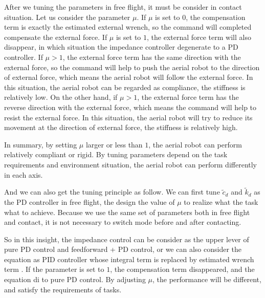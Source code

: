 After we tuning the parameters in free flight, it must be consider in contact situation. Let us consider the parameter $\mu$. If $\mu$ is set to $0$, the compensation term is exactly the estimated external wrench, so the command will completed compensate the external force. If $\mu$ is set to $1$, the external force term will also disappear, in which situation the impedance controller degenerate to a PD controller. If $\mu >1$, the external force term has the same direction with the external force, so the command will help to push the aerial robot to the direction of external force, which means the aerial robot will follow the external force. In this situation, the aerial robot can be regarded as compliance, the stiffness is relatively low. On the other hand, if $\mu >1$, the external force term has the reverse direction with the external force, which means the command will help to resist the external force. In this situation, the aerial robot will try to reduce its movement at the direction of external force, the stiffness is relatively high. 

In summary, by setting $\mu$ larger or less than $1$, the aerial robot can perform relatively compliant or rigid. By tuning parameters depend on the task requirements and environment situation, the aerial robot can perform differently in each axis. 

And we can also get the tuning principle as follow. We can first tune $\tilde{c}_d$ and $\tilde{k}_d$ as the PD controller in free flight, the design the value of $\mu$ to realize what the task what to achieve. Because we use the same set of parameters both in free flight and contact, it is not necessary to switch mode before and after contacting.


So in this insight, the impedance control can be consider as the upper lever of pure PD control and feedforward + PD control, or we can also consider the equation as PID controller whose integral term is replaced by estimated wrench term \cite{bodie_2023_omnidirectional}. If the parameter is set to $1$, the compensation term disappeared, and the equation di to pure PD control. By adjusting $\mu$, the performance will be different, and satisfy the requirements of tasks.





